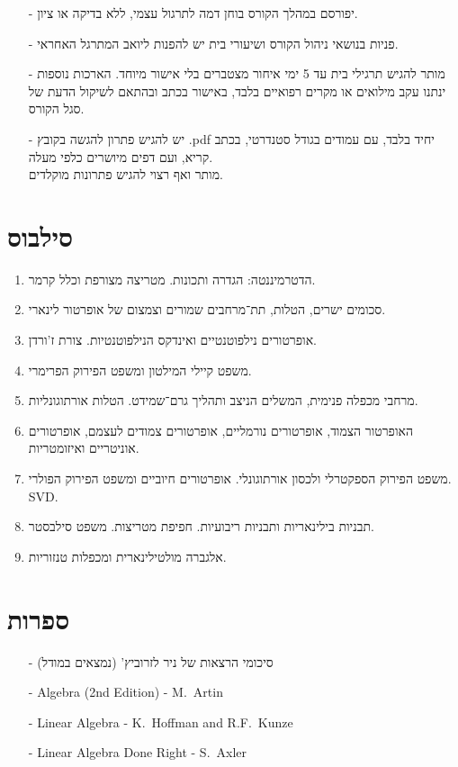 \documentclass{article}
\begin{document}
\begin{itemize}
\item[-]
יפורסם במהלך הקורס בוחן דמה לתרגול עצמי, ללא בדיקה או ציון.
\item[-]
פניות בנושאי ניהול הקורס ושיעורי בית יש להפנות ליואב המתרגל האחראי.
\item[-]
מותר להגיש תרגילי בית עד 5 ימי איחור מצטברים בלי אישור מיוחד. הארכות נוספות ינתנו עקב מילואים או מקרים רפואיים בלבד, באישור בכתב ובהתאם לשיקול הדעת של סגל הקורס.
\item[-]
יש להגיש פתרון להגשה בקובץ \textenglish{.pdf} יחיד בלבד, עם עמודים בגודל סטנדרטי, בכתב קריא, ועם דפים מיושרים כלפי מעלה.
\\
מותר ואף רצוי להגיש פתרונות מוקלדים.
\end{itemize}

\pagebreak

\section*{סילבוס}
\begin{enumerate}
\item הדטרמיננטה: הגדרה ותכונות. מטריצה מצורפת וכלל קרמר.
\item סכומים ישרים, הטלות, תת־מרחבים שמורים וצמצום של אופרטור לינארי.
\item אופרטורים נילפוטנטיים ואינדקס הנילפוטנטיות. צורת ז'ורדן.
\item משפט קיילי המילטון ומשפט הפירוק הפרימרי.
\item מרחבי מכפלה פנימית, המשלים הניצב ותהליך גרם־שמידט. הטלות אורתוגונליות.
\item האופרטור הצמוד, אופרטורים נורמליים, אופרטורים צמודים לעצמם, אופרטורים אוניטריים ואיזומטריות.
\item משפט הפירוק הספקטרלי ולכסון אורתוגונלי. אופרטורים חיוביים ומשפט הפירוק הפולרי. \textenglish{SVD}.
\item תבניות בילינאריות ותבניות ריבועיות. חפיפת מטריצות. משפט סילבסטר.
\item אלגברה מולטילינארית ומכפלות טנזוריות.
\end{enumerate}

\section*{ספרות}
\begin{itemize}
\item[-] סיכומי הרצאות של ניר לזרוביץ' (נמצאים במודל)
\item[-] \textenglish{Algebra (2nd Edition) - M.~Artin}
\item[-] \textenglish{Linear Algebra - K.~Hoffman and R.F.~Kunze}
\item[-] \textenglish{Linear Algebra Done Right - S.~Axler}
\end{itemize}
\end{document}
